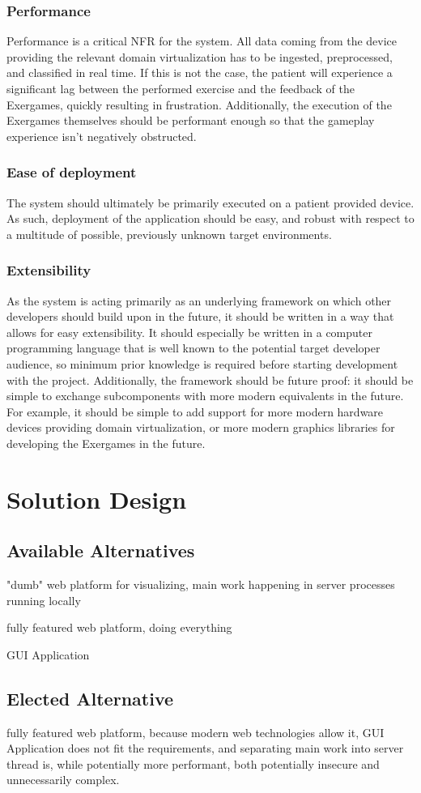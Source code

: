 \subsubsection{Performance}
Performance is a critical \gls{NFR} for the system. All data coming from the device providing the relevant domain virtualization has to be ingested, preprocessed, and classified in real time. If this is not the case, the patient will experience a significant lag between the performed exercise and the feedback of the Exergames, quickly resulting in frustration. Additionally, the execution of the Exergames themselves should be performant enough so that the gameplay experience isn't negatively obstructed. 

\subsubsection{Ease of deployment}
The system should ultimately be primarily executed on a patient provided device. As such, deployment of the application should be easy, and robust with respect to a multitude of possible, previously unknown target environments.

\subsubsection{Extensibility}
As the system is acting primarily as an underlying framework on which other developers should build upon in the future, it should be written in a way that allows for easy extensibility. It should especially be written in a computer programming language that is well known to the potential target developer audience, so minimum prior knowledge is required before starting development with the project. Additionally, the framework should be future proof: it should be simple to exchange subcomponents with more modern equivalents in the future. For example, it should be simple to add support for more modern hardware devices providing domain virtualization, or more modern graphics libraries for developing the Exergames in the future.

\section{Solution Design}
\subsection{Available Alternatives}
"dumb" web platform for visualizing, main work happening in server processes running locally

fully featured web platform, doing everything

GUI Application
\subsection{Elected Alternative}
fully featured web platform, because modern web technologies allow it, GUI Application does not fit the requirements, and separating main work into server thread is, while potentially more performant, both potentially insecure and unnecessarily complex.